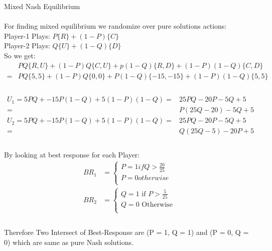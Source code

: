 \documentclass[
  course = {{IE579 Game Theory and Multi-Agent Reinforcement Learning}},
  quartile = {{4}},
  assignment = 2,
  name = {{Mohammad Mahdi Rahimi}},
  studentnumber = {{20208244}},
  email = {{mahi@kaist.ac.kr}},
  firstexercise = 1
]{aga-homework}
\begin{document}
\subexercise Mixed Nash Equilibrium \\\\
For finding mixed equilibrium we randomize over pure solutions actions:\\
Player-1 Plays: $P\{R\} + (1 - P)\{C\}$\\
Player-2 Plays: $Q\{U\} + (1 - Q)\{D\}$\\
So we get:\\
\begin{equation} \label{eq1}
\begin{split}
& PQ\{R, U\} + (1 - P)Q\{C, U\} + p(1 - Q)\{R, D\} + (1 - P)(1 - Q)\{C, D\} \\
= & PQ\{5, 5\} + (1 - P)Q\{0, 0\} + P(1 - Q)\{-15, -15\} + (1 - P)(1 - Q)\{5, 5\}\\
\end{split}
\end{equation}\\
\begin{equation} \label{eq1}
\begin{split}
      U_1 = 5PQ + -15P(1 - Q) + 5(1 - P)(1 - Q) = & 25PQ - 20P - 5Q + 5 \\
                                                = & P(25Q - 20) - 5Q + 5 \\
      U_2 = 5PQ + -15P(1 - Q) + 5(1 - P)(1 - Q) = & 25PQ - 20P - 5Q + 5 \\
                                                = & Q(25Q - 5) - 20P + 5 \\
\end{split}
\end{equation}\\
By looking at best response for each Player:
\begin{equation} \label{eq1}
\begin{split}
BR_1 & = \begin{cases}
      P = 1 if  Q > \frac{20}{25} \\
      P = 0 otherwise\\
     \end{cases}\\
BR_2 & = \begin{cases}
      Q = 1\text{ if  }P > \frac{5}{25} \\
      Q = 0\text{ Otherwise }\\
     \end{cases}\\
\end{split}
\end{equation}\\
Therefore Two Intersect of Best-Response are (P = 1, Q = 1) and (P = 0, Q = 0) which are same as pure Nash solutions.
\end{document}
